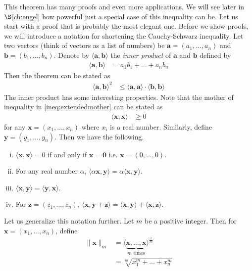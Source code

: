 \documentclass{subfile}
\begin{document}
	This theorem has many proofs and even more applications. We will see later in \hyperref[ch:engel]{$\S$\ref{ch:engel}} how powerful just a special case of this inequality can be. Let us start with a proof that is probably the most elegant one. Before we show proofs, we will introduce a notation for shortening the Cauchy-Schwarz inequality. Let two vectors (think of vectors as a list of numbers) be $\mathbf{a}=(a_1,\ldots,a_n)$ and $\mathbf{b}=(b_1,\ldots,b_n)$. Denote by $\langle \mathbf{a},\mathbf{b}\rangle$ the \textit{inner product} of $\mathbf{a}$ and $\mathbf{b}$ defined by
		\begin{align*}
			\langle \mathbf{a},\mathbf{b}\rangle
				& = a_1b_1+\ldots+a_nb_n
		\end{align*}
	Then the theorem can be stated as
		\begin{align*}
			\langle \mathbf{a},\mathbf{b}\rangle^2
				& \leq\langle\mathbf{a},\mathbf{a}\rangle\cdot\langle\mathbf{b},\mathbf{b}\rangle
		\end{align*}
	The inner product has some interesting properties. Note that the mother of inequality in \ref{ineq:extendedmother} can be  stated as
		\begin{align*}
			\langle\mathbf{x},\mathbf{x}\rangle
				& \geq0
		\end{align*}
	for any $\mathbf{x}=(x_1,\ldots,x_n)$ where $x_i$ is a real number. Similarly, define $\mathbf{y}=(y_1,\ldots,y_n)$. Then we have the following.
		\begin{enumerate}[(i)]\label{list:innerprops}
			\item $\langle\mathbf{x},\mathbf{x}\rangle=0$ if and only if $\mathbf{x}=\mathbf{0}$ i.e. $\mathbf{x}=(0,\ldots,0)$.
			\item For any real number $\alpha$, $\langle\alpha\mathbf{x},\mathbf{y}\rangle=\alpha\langle\mathbf{x},\mathbf{y}\rangle$.
			\item $\langle\mathbf{x},\mathbf{y}\rangle=\langle\mathbf{y},\mathbf{x}\rangle$.
			\item For $\mathbf{z}=(z_1,\ldots,z_n)$, $\langle\mathbf{x},\mathbf{y}+\mathbf{z}\rangle=\langle\mathbf{x},\mathbf{y}\rangle+\langle\mathbf{x},\mathbf{z}\rangle$.
		\end{enumerate}
	Let us generalize this notation further. Let $m$ be a positive integer. Then for $\mathbf{x}=(x_1,\ldots,x_n)$, define
		\begin{align*}
			\|\mathbf{x}\|_m
				& = \langle\underbrace{\mathbf{x},\ldots,\mathbf{x}}_{m\mbox{ times}}\rangle^{\frac{1}{m}}\\
				& = \sqrt[m]{x_1^m+\ldots+x_n^m}
		\end{align*}
\end{document}
